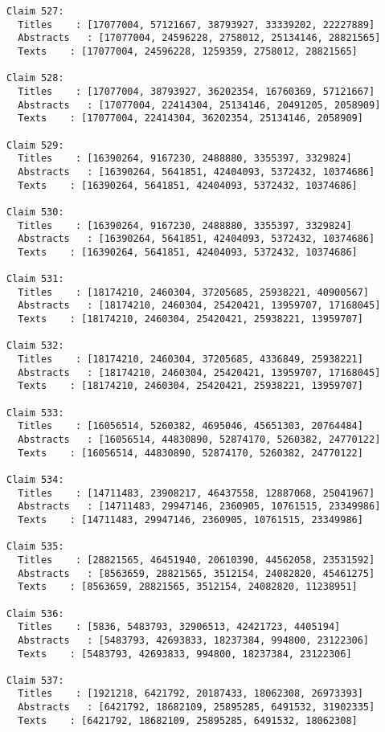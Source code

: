 \documentclass[11pt]{article}
\begin{document}
\begin{Verbatim}[commandchars=\\\{\}]
Claim 527:
  Titles    : [17077004, 57121667, 38793927, 33339202, 22227889]
  Abstracts   : [17077004, 24596228, 2758012, 25134146, 28821565]
  Texts    : [17077004, 24596228, 1259359, 2758012, 28821565]

Claim 528:
  Titles    : [17077004, 38793927, 36202354, 16760369, 57121667]
  Abstracts   : [17077004, 22414304, 25134146, 20491205, 2058909]
  Texts    : [17077004, 22414304, 36202354, 25134146, 2058909]

Claim 529:
  Titles    : [16390264, 9167230, 2488880, 3355397, 3329824]
  Abstracts   : [16390264, 5641851, 42404093, 5372432, 10374686]
  Texts    : [16390264, 5641851, 42404093, 5372432, 10374686]

Claim 530:
  Titles    : [16390264, 9167230, 2488880, 3355397, 3329824]
  Abstracts   : [16390264, 5641851, 42404093, 5372432, 10374686]
  Texts    : [16390264, 5641851, 42404093, 5372432, 10374686]

Claim 531:
  Titles    : [18174210, 2460304, 37205685, 25938221, 40900567]
  Abstracts   : [18174210, 2460304, 25420421, 13959707, 17168045]
  Texts    : [18174210, 2460304, 25420421, 25938221, 13959707]

Claim 532:
  Titles    : [18174210, 2460304, 37205685, 4336849, 25938221]
  Abstracts   : [18174210, 2460304, 25420421, 13959707, 17168045]
  Texts    : [18174210, 2460304, 25420421, 25938221, 13959707]

Claim 533:
  Titles    : [16056514, 5260382, 4695046, 45651303, 20764484]
  Abstracts   : [16056514, 44830890, 52874170, 5260382, 24770122]
  Texts    : [16056514, 44830890, 52874170, 5260382, 24770122]

Claim 534:
  Titles    : [14711483, 23908217, 46437558, 12887068, 25041967]
  Abstracts   : [14711483, 29947146, 2360905, 10761515, 23349986]
  Texts    : [14711483, 29947146, 2360905, 10761515, 23349986]

Claim 535:
  Titles    : [28821565, 46451940, 20610390, 44562058, 23531592]
  Abstracts   : [8563659, 28821565, 3512154, 24082820, 45461275]
  Texts    : [8563659, 28821565, 3512154, 24082820, 11238951]

Claim 536:
  Titles    : [5836, 5483793, 32906513, 42421723, 4405194]
  Abstracts   : [5483793, 42693833, 18237384, 994800, 23122306]
  Texts    : [5483793, 42693833, 994800, 18237384, 23122306]

Claim 537:
  Titles    : [1921218, 6421792, 20187433, 18062308, 26973393]
  Abstracts   : [6421792, 18682109, 25895285, 6491532, 31902335]
  Texts    : [6421792, 18682109, 25895285, 6491532, 18062308]


\end{Verbatim}
\end{document}
